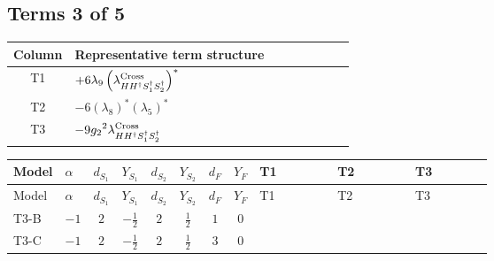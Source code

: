 \documentclass[8pt]{article}
\begin{document}
\begin{landscape}
\subsection*{Terms 3 of 5}
\begin{center}
\begin{tabular}{@{}c >{\raggedright\arraybackslash}p{0.82\linewidth}@{}}
\toprule
Column & Representative term structure \\
\midrule
T1 & \(\displaystyle +6 {\lambda_9} \left({\lambda_{H H^\dagger S_1^\dagger S_2^\dagger}^{\rm Cross}}\right)^{*}\) \\
\midrule
T2 & \(\displaystyle -6 \left({\lambda_8}\right)^{*} \left({\lambda_5}\right)^{*}\) \\
\midrule
T3 & \(\displaystyle -9 {g_2}^2 {\lambda_{H H^\dagger S_1^\dagger S_2^\dagger}^{\rm Cross}}\) \\
\midrule
\bottomrule
\end{tabular}
\end{center}
\smallskip
\tiny
\begin{longtable}{@{}llcccccc >{\raggedright\arraybackslash}p{0.21\linewidth} >{\raggedright\arraybackslash}p{0.21\linewidth} >{\raggedright\arraybackslash}p{0.21\linewidth}@{}}
\toprule
Model & $\alpha$ & $d_{S_1}$ & $Y_{S_1}$ & $d_{S_2}$ & $Y_{S_2}$ & $d_F$ & $Y_F$ & T1 & T2 & T3 \\
\midrule
\endfirsthead
\toprule
Model & $\alpha$ & $d_{S_1}$ & $Y_{S_1}$ & $d_{S_2}$ & $Y_{S_2}$ & $d_F$ & $Y_F$ & T1 & T2 & T3 \\
\midrule
\endhead
T3-B & $-1$ & $2$ & $-\frac{1}{2}$ & $2$ & $\frac{1}{2}$ & $1$ & $0$ & \scriptsize\adjustbox{max width=\linewidth}{$\begin{gathered} +6 {\lambda_9} \left({\lambda_{H H^\dagger S_1^\dagger S_2^\dagger}^{\rm Cross}}\right)^{*}\end{gathered}$} & \scriptsize\adjustbox{max width=\linewidth}{$\begin{gathered} -6 \left({\lambda_8}\right)^{*} \left({\lambda_5}\right)^{*}\end{gathered}$} & \scriptsize\adjustbox{max width=\linewidth}{$\begin{gathered} -9 {g_2}^2 {\lambda_{H H^\dagger S_1^\dagger S_2^\dagger}^{\rm Cross}}\end{gathered}$} \\
\midrule
T3-C & $-1$ & $2$ & $-\frac{1}{2}$ & $2$ & $\frac{1}{2}$ & $3$ & $0$ & \scriptsize\adjustbox{max width=\linewidth}{$\begin{gathered} +6 {\lambda_9} \left({\lambda_{H H^\dagger S_1^\dagger S_2^\dagger}^{\rm Cross}}\right)^{*}\end{gathered}$} & \scriptsize\adjustbox{max width=\linewidth}{$\begin{gathered} -6 \left({\lambda_8}\right)^{*} \left({\lambda_5}\right)^{*}\end{gathered}$} & \scriptsize\adjustbox{max width=\linewidth}{$\begin{gathered} -9 {g_2}^2 {\lambda_{H H^\dagger S_1^\dagger S_2^\dagger}^{\rm Cross}}\end{gathered}$} \\

\end{longtable}
\end{landscape}
\end{document}
